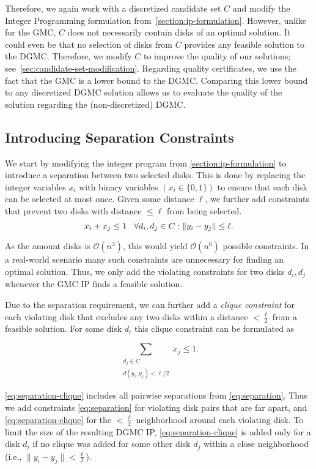 \documentclass[letterpaper, 10 pt, conference]{ieeeconf}
\newcommand{\bigO}{\mathcal{O}} %
\newcommand{\gmcip}{GMC IP}
\newcommand{\dgmcip}{DGMC IP}
\begin{document}
Therefore, we again work with a discretized candidate set $C$ and modify the Integer Programming formulation from~\cref{section:ip-formulation}.
However, unlike for the GMC, $C$ does not necessarily contain disks of an optimal solution.
It could even be that no selection of disks from $C$ provides any feasible solution to the DGMC.
Therefore, we modify $C$ to improve the quality of our solutions; see~\cref{sec:candidate-set-modification}.
Regarding quality certificates, we use the fact that the GMC is a lower bound to the DGMC.
Comparing this lower bound to any discretized DGMC solution allows us to evaluate the quality of the solution regarding the (non-discretized) DGMC.

\subsection{Introducing Separation Constraints}
We start by modifying the integer program from \cref{section:ip-formulation} to introduce a separation between two selected disks.
This is done by replacing the integer variables $x_i$ with binary variables $(x_i \in \{0,1\})$ to ensure that each disk can be selected at most once.
Given some distance $\ell$, we further add constraints that prevent two disks with distance $\leq \ell$ from being selected.
%
\begin{equation}
    x_i + x_j \leq 1 \hspace{3mm} \forall d_i, d_j \in C: \lVert y_i - y_j \rVert \leq \ell.
    \label{eq:separation}
\end{equation}

As the amount disks is $\bigO(n^3)$, this would yield  $\bigO(n^6)$ possible constraints.
In a real-world scenario many such constraints are unnecessary for finding an optimal solution.
Thus, we only add the violating constraints for two disks $d_i,d_j$ whenever the \gmcip{} finds a feasible solution.

Due to the separation requirement, we can further add a \emph{clique constraint} for each violating disk that excludes any two disks within a distance $< \frac{\ell}{2}$ from a feasible solution.
For some disk $d_i$ this clique constraint can be formulated as

\begin{equation}
    \sum_{\substack{d_j\in C\\ d(y_i, y_j) < \ell/2}} x_j \leq 1.
    \label{eq:separation-clique}
\end{equation}

\cref{eq:separation-clique} includes all pairwise separations from \cref{eq:separation}.
Thus we add constraints \cref{eq:separation} for violating disk pairs that are far apart, and \cref{eq:separation-clique} for the $< \frac{\ell}{2}$ neighborhood around each violating disk.
To limit the size of the resulting \dgmcip{}, \cref{eq:separation-clique} is added only for a disk $d_i$ if no clique was added for some other disk $d_j$ within a close neighborhood (i.e., $\lVert y_i - y_j \rVert < \frac{\ell}{2}$).
\end{document}
